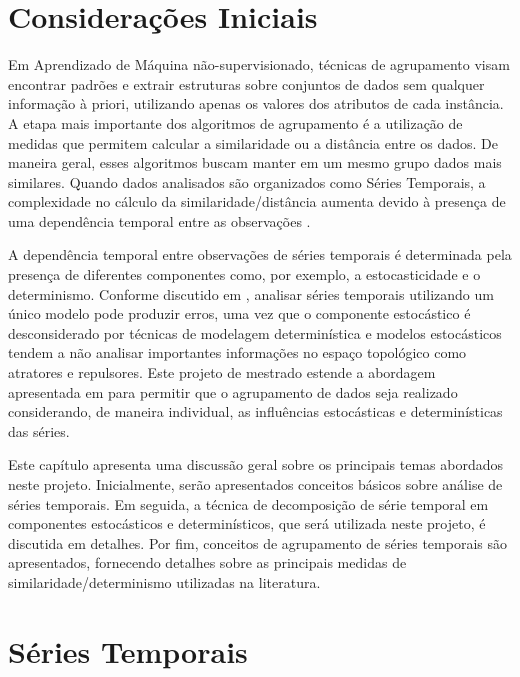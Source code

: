   {} \label{revisao}
\section{Considerações Iniciais}

Em Aprendizado de Máquina não-supervisionado, técnicas de agrupamento visam encontrar padrões e extrair estruturas sobre conjuntos de dados sem qualquer informação à priori, utilizando apenas os valores dos atributos de cada instância. A etapa mais importante dos algoritmos de agrupamento é a utilização de medidas que permitem calcular a similaridade ou a distância entre os dados. De maneira geral, esses algoritmos buscam manter em um mesmo grupo dados mais similares. Quando dados analisados são organizados como Séries Temporais, a complexidade no cálculo da similaridade/distância aumenta devido à presença de uma dependência temporal entre as observações \cite{Aghabozorgi2015, zhang2011}. 
 
A dependência temporal entre observações de séries temporais é determinada pela presença de diferentes componentes como, por exemplo, a estocasticidade e o determinismo. Conforme discutido em , analisar séries temporais utilizando um único modelo pode produzir erros, uma vez que o componente estocástico é desconsiderado por técnicas de modelagem determinística e modelos estocásticos tendem a não analisar importantes informações no espaço topológico como atratores e repulsores. Este projeto de mestrado estende a abordagem apresentada em \cite{Araujo2013, Araujo2015} para permitir que o agrupamento de dados seja realizado considerando, de maneira individual, as influências estocásticas e determinísticas das séries.

Este capítulo apresenta uma discussão geral sobre os principais temas abordados neste projeto. Inicialmente, serão apresentados conceitos básicos sobre análise de séries temporais. Em seguida, a técnica de decomposição de série temporal em componentes estocásticos e determinísticos, que será utilizada neste projeto, é discutida em detalhes. Por fim, conceitos de agrupamento de séries temporais são apresentados, fornecendo detalhes sobre as principais medidas de similaridade/determinismo utilizadas na literatura.

\section{S\'{e}ries Temporais}

